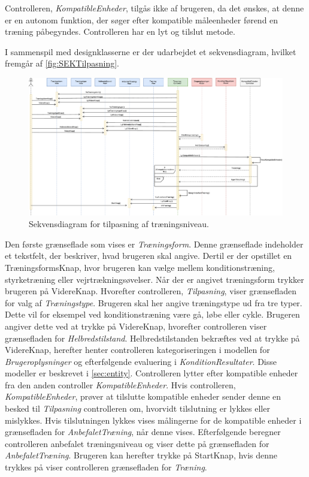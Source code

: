 \noindent 
Controlleren, \textit{KompatibleEnheder}, tilgås ikke af brugeren, da det ønskes, at denne er en autonom funktion, der søger efter kompatible måleenheder førend en træning påbegyndes. Controlleren har en lyt og tilslut metode. 

I sammenspil med designklasserne er der udarbejdet et sekvensdiagram, hvilket fremgår af \autoref{fig:SEKTilpasning}. 

\begin{figure} [H]
\centering
\includegraphics[width=1\textwidth]{figures/Sek/SEKTilpasning}
\caption{Sekvensdiagram for tilpasning af træningsniveau.}
\label{fig:SEKTilpasning}
\end{figure}

\noindent
Den første grænseflade som vises er \textit{Træningsform}. Denne grænseflade indeholder et tekstfelt, der beskriver, hvad brugeren skal angive. Dertil er der opstillet en TræningsformsKnap, hvor brugeren kan vælge mellem konditionstræning, styrketræning eller vejrtrækningsøvelser. Når der er angivet træningsform trykker brugeren på VidereKnap. Hvorefter controlleren, \textit{Tilpasning}, viser grænsefladen for valg af \textit{Træningstype}. Brugeren skal her angive træningstype ud fra tre typer. Dette vil for eksempel ved konditionstræning være gå, løbe eller cykle. Brugeren angiver dette ved at trykke på VidereKnap, hvorefter controlleren viser grænsefladen for \textit{Helbredstilstand}. Helbredstilstanden bekræftes ved at trykke på VidereKnap, herefter henter controlleren kategoriseringen i modellen for \textit{Brugeroplysninger} og efterfølgende evaluering i \textit{KonditionResultater}. Disse modeller er beskrevet i \autoref{sec:entity}.
Controlleren lytter efter kompatible enheder fra den anden controller \textit{KompatibleEnheder}. Hvis controlleren, \textit{KompatibleEnheder}, prøver at tilslutte kompatible enheder sender denne en besked til \textit{Tilpasning} controlleren om, hvorvidt tilslutning er lykkes eller mislykkes. Hvis tilslutningen lykkes vises målingerne for de kompatible enheder i grænsefladen for \textit{AnbefaletTræning}, når denne vises. Efterfølgende beregner controlleren anbefalet træningsniveau og viser dette på grænsefladen for \textit{AnbefaletTræning}. Brugeren kan herefter trykke på StartKnap, hvis denne trykkes på viser controlleren grænsefladen for \textit{Træning}. 
